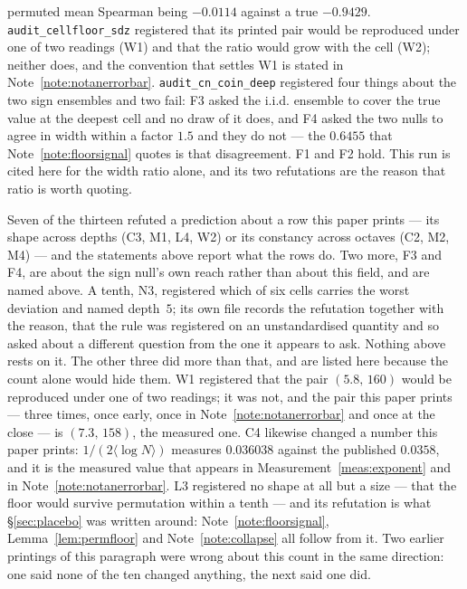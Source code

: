 \documentclass[11pt,a4paper]{article}
\theoremstyle{plain}
\theoremstyle{definition}
\theoremstyle{remark}
\begin{document}
permuted mean Spearman being $-0.0114$ against a true $-0.9429$. \texttt{audit\_cellfloor\_sdz}
registered that its printed pair would be reproduced under one of two
readings (W1) and that the ratio would grow with the cell (W2); neither
does, and the convention that settles W1 is stated in
Note~\ref{note:notanerrorbar}. \texttt{audit\_cn\_coin\_deep}
registered four things about the two sign ensembles and two fail:
F3 asked the i.i.d. ensemble to cover the true value at the
deepest cell and no draw of it does, and F4 asked the two nulls to
agree in width within a factor $1.5$ and they do not --- the
$0.6455$ that Note~\ref{note:floorsignal} quotes is that
disagreement. F1 and F2 hold. This run is cited here for the width
ratio alone, and its two refutations are the reason that ratio is
worth quoting.

Seven of the thirteen refuted a prediction about a row this paper
prints --- its shape across depths (C3, M1, L4, W2) or its
constancy across octaves (C2, M2, M4) --- and the statements
above report what the rows do. Two more, F3 and F4, are about the
sign null's own reach rather than about this field, and are
named above. A tenth, N3, registered which of six cells carries the
worst deviation and named depth~$5$; its own file records the
refutation together with the reason, that the rule was registered on
an unstandardised quantity and so asked about a different question
from the one it appears to ask. Nothing above rests on it. The other
three
did more than that, and are listed here because the count alone would
hide them. W1 registered that the pair $(5.8,\,160)$ would be
reproduced under one of two readings; it was not, and the pair this
paper prints --- three times, once early, once in
Note~\ref{note:notanerrorbar} and once at the close --- is
$(7.3,\,158)$, the measured one. C4 likewise changed a number this
paper prints: $1/(2\langle\log N\rangle)$ measures $0.036038$ against
the published $0.0358$, and it is the measured value that appears in
Measurement~\ref{meas:exponent} and in
Note~\ref{note:notanerrorbar}. L3 registered no shape at all but a
size --- that the floor would survive permutation within a tenth ---
and its refutation is what \S\ref{sec:placebo} was written around:
Note~\ref{note:floorsignal}, Lemma~\ref{lem:permfloor} and
Note~\ref{note:collapse} all follow from it. Two earlier printings of
this paragraph were wrong about this count in the same direction: one
said none of the ten changed anything, the next said one did.
\end{document}
